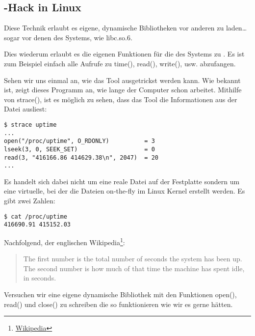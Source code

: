 \subsection{-Hack in Linux}

\label{ld_preload}

Diese Technik erlaubt es eigene, dynamische Bibliotheken vor anderen zu laden\dots{}
sogar vor denen des Systems, wie libc.so.6.

Dies wiederum erlaubt es die eigenen Funktionen für die des Systems zu .
Es ist zum Beispiel einfach alle Aufrufe zu time(), read(), write(), usw. abzufangen.

Sehen wir uns einmal an, wie das Tool  ausgetrickst werden kann.
Wie bekannt ist, zeigt dieses Programm an, wie lange der Computer schon arbeitet.
Mithilfe von strace(), ist es möglich zu sehen, dass das Tool die
Informationen aus der Datei  ausliest:

\begin{lstlisting}
$ strace uptime 
...
open("/proc/uptime", O_RDONLY)          = 3
lseek(3, 0, SEEK_SET)                   = 0
read(3, "416166.86 414629.38\n", 2047)  = 20
...
\end{lstlisting}

Es handelt sich dabei nicht um eine reale Datei auf der Festplatte sondern um eine
virtuelle, bei der die Dateien on-the-fly im Linux Kernel erstellt werden.
Es gibt zwei Zahlen:

\begin{lstlisting}
$ cat /proc/uptime
416690.91 415152.03
\end{lstlisting}

Nachfolgend, der englischen Wikipedia\footnote{\href{http://go.yurichev.com/17043}{Wikipedia}}:

\begin{framed}
\begin{quotation}
The first number is the total number of seconds the system has been up.
The second number is how much of that time the machine has spent idle, in seconds.
\end{quotation}
\end{framed}


Versuchen wir eine eigene dynamische Bibliothek mit den Funktionen open(), read()
und close() zu schreiben die so funktionieren wie wir es gerne hätten.


